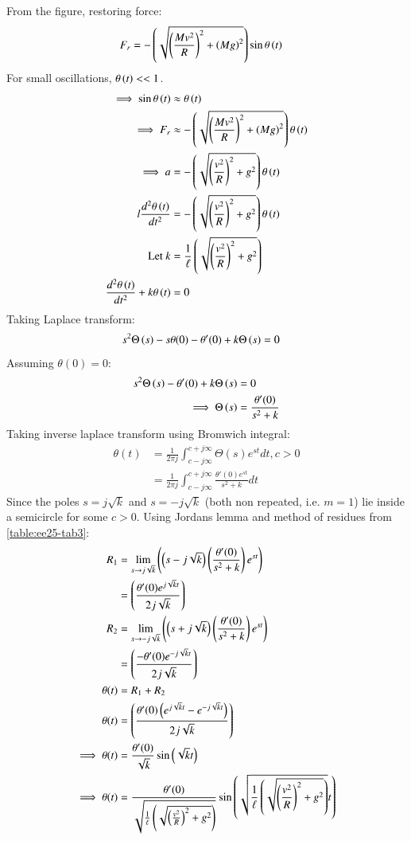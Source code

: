 \documentclass[journal,12pt,twocolumn]{IEEEtran}
\theoremstyle{remark}
\begin{document}
From the figure, restoring force:
\begin{align}
F_r &= -\left(\sqrt{\left(\frac{Mv^2}{R}\right)^2+\left(Mg\right)^2}\right)\sin{\theta\ensuremath{\left(t\right)}}
\end{align}
For small oscillations, $\theta\left(t\right) << 1$.
\begin{align}
\implies \sin{\theta\ensuremath{\left(t\right)}} &\approx \theta\left(t\right) \\
\implies F_r &\approx -\left(\sqrt{\left(\frac{Mv^2}{R}\right)^2+\left(Mg\right)^2}\right)\theta\left(t\right) \\
\implies a &= -\left(\sqrt{\left(\frac{v^2}{R}\right)^2+g^2}\right)\theta\left(t\right) \\
l\frac{d^2\theta\left(t\right)}{dt^2} &= -\left(\sqrt{\left(\frac{v^2}{R}\right)^2+g^2}\right)\theta\left(t\right) \\
\text{Let } k &= \frac{1}{\ell}\left(\sqrt{\left(\frac{v^2}{R}\right)^2+g^2}\right) \\
\frac{d^2\theta\left(t\right)}{dt^2} + k\theta\left(t\right) &= 0 \\
\end{align}
Taking Laplace transform:
\begin{align}
s^2\Theta\left(s\right) - s\theta(0) - \theta'(0) + k\Theta\left(s\right) &= 0
\end{align}
Assuming $\theta(0) = 0$:
\begin{align}
s^2\Theta\left(s\right) - \theta'(0) + k\Theta\left(s\right) &= 0 \\
\implies \Theta\left(s\right) &= \frac{\theta'(0)}{s^2 + k}
\end{align}
Taking inverse laplace transform using Bromwich integral:
\begin{align}
\theta(t) &= \frac{1}{2\pi j}\int_{c-j\infty}^{c+j\infty}\Theta(s)e^{st}dt, c > 0 \\
&= \frac{1}{2\pi j}\int_{c-j\infty}^{c+j\infty}\frac{\theta'(0)e^{st}}{s^2 + k}dt
\end{align}
Since the poles $s=j\sqrt{k}$ and $s=-j\sqrt{k}$ (both non repeated, i.e. $m=1$) lie inside a semicircle for some $c>0$. Using Jordans lemma and method of residues from \ref{table:ee25-tab3}:
\begin{align}
R_1&=\lim\limits_{s\to j\sqrt{k}}\left({\left(s-j\sqrt{k}\right)}\left(\frac{\theta'(0)}{s^2+k}\right) e^{st}\right)\\
&={\left(\frac{\theta'(0)e^{j\sqrt{k}t}}{2j\sqrt{k}}\right)}\\
R_2&=\lim\limits_{s\to -j\sqrt{k}}\left({\left(s+j\sqrt{k}\right)}\left(\frac{\theta'(0)}{s^2+k}\right) e^{st}\right)\\
&={\left(\frac{-\theta'(0)e^{-j\sqrt{k}t}}{2j\sqrt{k}}\right)}\\
\theta(t) &= R_1 + R_2\\
\theta(t) &= {\left(\frac{\theta'(0)\left(e^{j\sqrt{k}t}-e^{-j\sqrt{k}t}\right)}{2j\sqrt{k}}\right)}\\
\implies
\theta(t) &=\frac{\theta'(0)}{\sqrt{k}}\sin{\ensuremath{\left(\sqrt{k}t\right)}} \\
\implies \theta(t) &= \frac{\theta'(0)}{\sqrt{\frac{1}{\ell}\left(\sqrt{\left(\frac{v^2}{R}\right)^2+g^2}\right)}}\sin{\ensuremath{\left(\sqrt{\frac{1}{\ell}\left(\sqrt{\left(\frac{v^2}{R}\right)^2+g^2}\right)}t\right)}}
\end{align}
\end{document}
